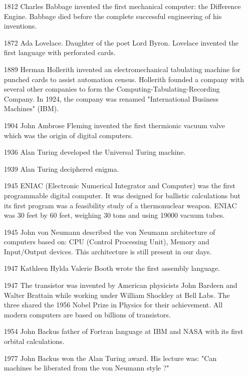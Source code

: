  \begin{itemize} 
 \setlength\itemsep{0cm}
 \item[1812] Charles Babbage invented the first mechanical computer: the Difference Engine.
 Babbage died before the complete successful engineering of his inventions. 
 \item[1872]  Ada Lovelace. Daughter of the poet Lord Byron. Lovelace invented the first language with perforated cards. 
 \item[1889]   Herman Hollerith invented an electromechanical tabulating machine for punched cards 
 to assist automation census. Hollerith founded a company with several other companies to form the 
 Computing-Tabulating-Recording Company. In 1924, the company was renamed 
 "International Business Machines" (IBM). 
 \item[1904] John Ambrose Fleming invented the first thermionic  vacuum valve which was the origin
 of digital computers.  
 \item[1936] Alan Turing developed the  Universal Turing machine. 
 \item[1939] Alan Turing deciphered enigma. 
 \item[1945]
 ENIAC (Electronic Numerical Integrator and Computer) was the first programmable digital computer. 
 It was designed for ballistic calculations but its first program was a feasibility study 
 of a thermonuclear weapon.
 ENIAC was 30 feet by 60 feet, weighing 30 tons and using 19000 vacuum tubes.
 
 \item[1945]  John von Neumann described the von Neumann architecture of computers based on: 
 CPU (Control Processing Unit), Memory and Input/Output devices. 
 This architecture is still present in our days.
   
 
 
 \item[1947]  Kathleen Hylda Valerie Booth wrote the first assembly language.
 
 \item [1947] 
 The  transistor was invented by American physicists John Bardeen and Walter  Brattain 
 while working under William Shockley at Bell Labs. 
 The three shared the 1956 Nobel Prize in Physics for their achievement. All modern computers
 are based on billions of transistors. 
   
 
 \item[1954]  John Backus father of Fortran language at IBM and NASA 
 with its first orbital calculations.
 \item[1977]  John Backus won the Alan Turing award. 
  His lecture was: "Can machines be liberated from the von Neumann style ?" 
  \end{itemize}      


